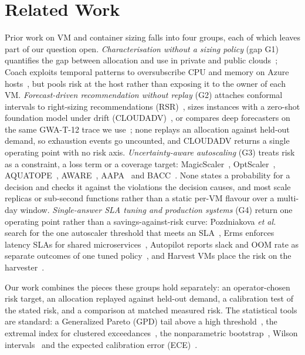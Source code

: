\documentclass[conference]{IEEEtran}
\begin{document}
\section{Related Work}
Prior work on VM and container sizing falls into four groups, each of which leaves part of our question open. \emph{Characterisation without a sizing policy} (gap G1) quantifies the gap between allocation and use in private and public clouds~\cite{qin2023,wacloud2025}; Coach exploits temporal patterns to oversubscribe CPU and memory on Azure hosts~\cite{coach2025}, but pools risk at the host rather than exposing it to the owner of each VM. \emph{Forecast-driven recommendation without replay} (G2) attaches conformal intervals to right-sizing recommendations (RSR)~\cite{rsr2025}, sizes instances with a zero-shot foundation model under drift (CLOUDADV)~\cite{cloudadv2026}, or compares deep forecasters on the same GWA-T-12 trace we use~\cite{kollu2024}; none replays an allocation against held-out demand, so exhaustion events go uncounted, and CLOUDADV returns a single operating point with no risk axis. \emph{Uncertainty-aware autoscaling} (G3) treats risk as a constraint, a loss term or a coverage target: MagicScaler~\cite{magicscaler2023}, OptScaler~\cite{optscaler2024}, AQUATOPE~\cite{aquatope2023}, AWARE~\cite{aware2023}, AAPA~\cite{aapa2025} and BACC~\cite{bacc2026}. None states a probability for a decision and checks it against the violations the decision causes, and most scale replicas or sub-second functions rather than a static per-VM flavour over a multi-day window. \emph{Single-answer SLA tuning and production systems} (G4) return one operating point rather than a savings-against-risk curve: Pozdniakova \emph{et al.} search for the one autoscaler threshold that meets an SLA~\cite{pozdniakova2024}, Erms enforces latency SLAs for shared microservices~\cite{erms2023}, Autopilot reports slack and OOM rate as separate outcomes of one tuned policy~\cite{autopilot2020}, and Harvest VMs place the risk on the harvester~\cite{harvest2020}.

Our work combines the pieces these groups hold separately: an operator-chosen risk target, an allocation replayed against held-out demand, a calibration test of the stated risk, and a comparison at matched measured risk. The statistical tools are standard: a Generalized Pareto (GPD) tail above a high threshold~\cite{pickands1975,coles2001}, the extremal index for clustered exceedances~\cite{ferro2003}, the nonparametric bootstrap~\cite{efron1993}, Wilson intervals~\cite{wilson1927} and the expected calibration error (ECE)~\cite{guo2017}.
\end{document}

